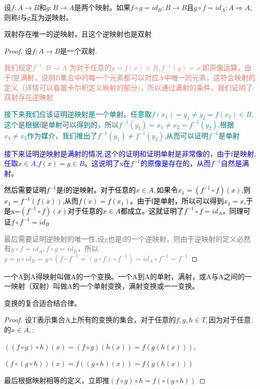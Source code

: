 \documentclass[
	11pt, %
	fleqn, %
	a4paper, %
]{LegrandOrangeBook}
\begin{document}
\begin{theorem}
	设$f:A\rightarrow B$和$g:B\rightarrow A$是两个映射。如果$f\circ g=id_B:B\rightarrow B$且$g\circ f=id_A:A\Rightarrow A$,则称f与g互为逆映射。
\end{theorem}


\begin{theorem}
	双射存在唯一的逆映射，且这个逆映射也是双射
\end{theorem}

\begin{proof}
	设$f:A\rightarrow B$是一个双射.

	\textcolor{Salmon}{我们规定$f^{-1}:B\rightarrow A$ 为对于任意的$y=f(x)\in B,f^{-1}(y)=x$,即原像运算。由于f是满射，说明B集合中的每一个元素都可以对应A中唯一的元素，这符合映射的定义（详情可以看笛卡尔积定义映射的部分)，所以通过满射的条件，我们证明了双射存在逆映射}

	\textcolor{teal}{接下来我们应该证明逆映射是一个单射。任意取$f(x_1)=y_1\not=y_2=f(x_2)\in B$,这个是根据f是单射可以得到的，所以$f^{-1}(y_1)=x_1\not=x_2=f^{-1}(y_2)$,根据$x_1\not=x_2$作为媒介，我们推出了$f^{-1}(y_1)\not=f^{-1}(y_2)$,从而可以证明$f^{-1}$是单射}

	\textcolor{blue}{接下来证明逆映射是满射的情况,这个的证明和证明单射是非常像的，由于f是映射,任取$x\in A$,$f(x)=y\in B$。这说明了x在$f^{-1}$的原像是存在的，从而$f^{-1}$自然是满射}。

	\textcolor{black}{然后需要证明$f^{-1}$是f的逆映射。对于任意的$x\in A,$如果令$x_1=(f^{-1}\circ f)(x)$,则$x_1=f^{-1}(f(x))$,从而$f(x)=f(x_1)$。由于f是单射，所以可以得到$x_1=x$,于是x=$(f^{-1}\circ f)(x)$对于任意的$x\in A$都成立。这就证明了$f^{-1}\circ f=id_A$，同理可证$f\circ f^{-1}=id_B$}

	\textcolor{gray}{最后需要证明逆映射的唯一性,设g也是f的一个逆映射，则由于逆映射的定义必然有$g\circ f=id_A,f\circ g=id_B$，所以$g=g\circ id_B=g\circ(f\circ f^{-1}=(g\circ f)\circ f^{-1})=id_A\circ f^{-1}=f^{-1}$}
\end{proof}

\begin{definition}
	一个A到A得映射叫做A的一个变换。一个A到A的单射，满射，或A与A之间的一一映射（双射）叫做A的一个单射变换，满射变换或一一变换。
\end{definition}

\begin{theorem}
	变换的复合适合结合律。
\end{theorem}

\begin{proof}
	设T表示集合A上所有的变换的集合，对于任意的$f,g,h\in T,$因为对于任意的$x\in A,$:

	$((f\circ g)\circ h)(x)=(f\circ g)(h(x))=f(g(h(x)))$,

	$(f\circ(g\circ h))(x)=f((g\circ h)(x))=f(g(h(x)))$

	最后根据映射相等的定义，立即推$(f\circ g)\circ h=f(\circ(g\circ h))$
\end{proof}
\end{document}
